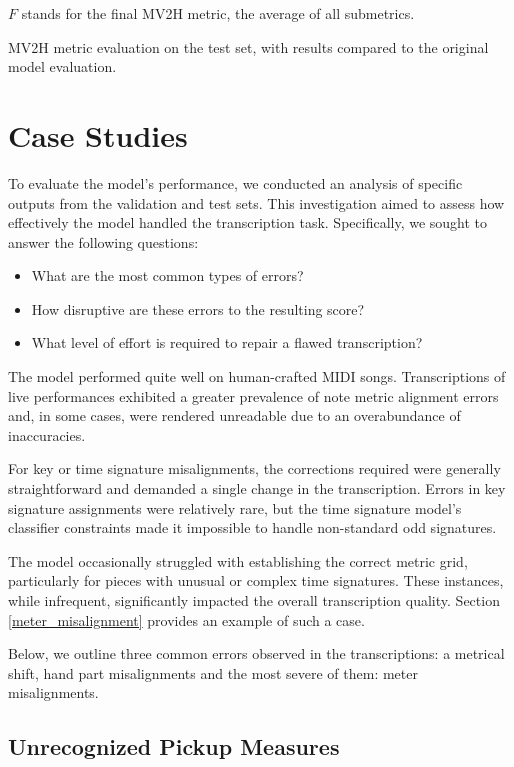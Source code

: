 $F$ stands for the final MV2H metric, the average of all submetrics.

\begin{table}[ht!]
\centering

\caption[MV2H metric evaluation on the test set.]{MV2H metric evaluation on the test set, with results compared to the original model evaluation.}
\end{table}

\section{Case Studies}

To evaluate the model’s performance, we conducted an analysis of specific outputs from the validation and test sets. This investigation aimed to assess how effectively the model handled the transcription task. Specifically, we sought to answer the following questions:
\begin{itemize} 
	\item What are the most common types of errors?
	\item How disruptive are these errors to the resulting score?
	\item What level of effort is required to repair a flawed transcription?
\end{itemize}

The model performed quite well on human-crafted MIDI songs. Transcriptions of live performances exhibited a greater prevalence of note metric alignment errors and, in some cases, were rendered unreadable due to an overabundance of inaccuracies.

For key or time signature misalignments, the corrections required were generally straightforward and demanded a single change in the transcription. Errors in key signature assignments were relatively rare, but the time signature model's classifier constraints made it impossible to handle non-standard odd signatures. 

The model occasionally struggled with establishing the correct metric grid, particularly for pieces with unusual or complex time signatures. These instances, while infrequent, significantly impacted the overall transcription quality. Section \ref{meter_misalignment} provides an example of such a case.

Below, we outline three common errors observed in the transcriptions: a metrical shift, hand part misalignments and the most severe of them: meter misalignments.

\subsection{Unrecognized Pickup Measures}

